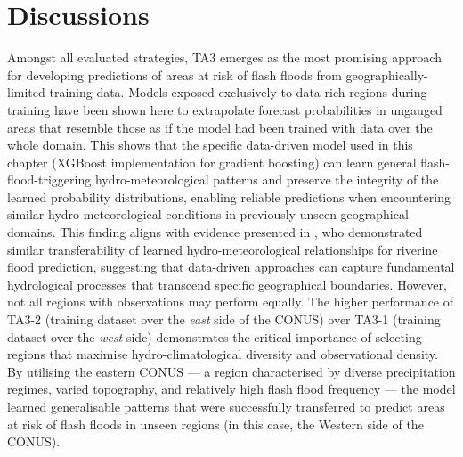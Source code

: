 \begin{figure}[htbp]
\label{fig:verif_breakdown_scores_reliability_diagram}
\end{figure}


\section{Discussions}
\label{regional_to_global_training_discussions}

Amongst  all evaluated strategies, TA3 emerges as the most promising approach for developing predictions of areas at risk of flash floods from geographically-limited training data. Models exposed exclusively to data-rich regions during training have been shown here to extrapolate forecast probabilities in ungauged areas that resemble those as if the model had been trained with data over the whole domain. This shows that the specific data-driven model used in this chapter (XGBoost implementation for gradient boosting) can learn general flash-flood-triggering hydro-meteorological patterns and preserve the integrity of the learned probability distributions, enabling reliable predictions when encountering similar hydro-meteorological conditions in previously unseen geographical domains. This finding aligns with evidence presented in \citet{Kratzert_2024}, who demonstrated similar transferability of learned hydro-meteorological relationships for riverine flood prediction, suggesting that data-driven approaches can capture fundamental hydrological processes that transcend specific geographical boundaries. However, not all regions with observations may perform equally. The higher performance of TA3-2 (training dataset over the \textit{east} side of the CONUS) over TA3-1 (training dataset over the \textit{west} side) demonstrates the critical importance of selecting regions that maximise hydro-climatological diversity and observational density. By utilising the eastern CONUS — a region characterised by diverse precipitation regimes, varied topography, and relatively high flash flood frequency — the model learned generalisable patterns that were successfully transferred to predict areas at risk of flash floods in unseen regions (in this case, the Western side of the CONUS). 

